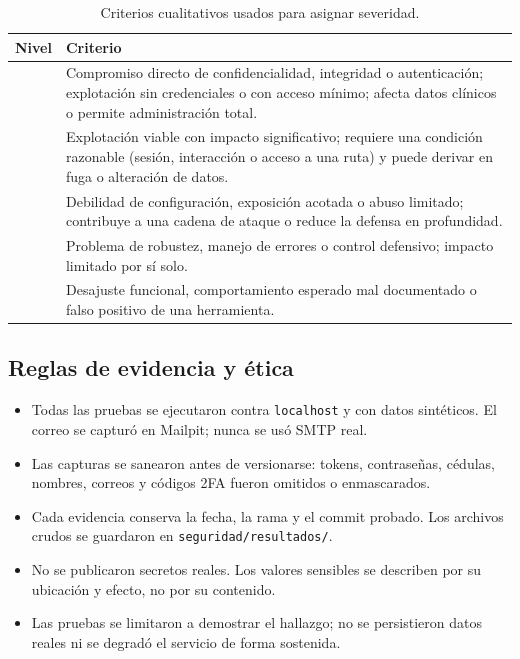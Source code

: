 \begin{table}[htbp]
\centering
\caption{Criterios cualitativos usados para asignar severidad.}
\label{tab:criterios}
\begin{tabular}{@{}L{2.3cm}L{12.6cm}@{}}
\toprule
\textbf{Nivel} & \textbf{Criterio}\\
\midrule
{} & Compromiso directo de confidencialidad, integridad o autenticación; explotación sin credenciales o con acceso mínimo; afecta datos clínicos o permite administración total.\\
 & Explotación viable con impacto significativo; requiere una condición razonable (sesión, interacción o acceso a una ruta) y puede derivar en fuga o alteración de datos.\\
 & Debilidad de configuración, exposición acotada o abuso limitado; contribuye a una cadena de ataque o reduce la defensa en profundidad.\\
 & Problema de robustez, manejo de errores o control defensivo; impacto limitado por sí solo.\\
 & Desajuste funcional, comportamiento esperado mal documentado o falso positivo de una herramienta.\\
\bottomrule
\end{tabular}
\end{table}

\subsection{Reglas de evidencia y ética}

\begin{itemize}
  \item Todas las pruebas se ejecutaron contra \texttt{localhost} y con datos
  sintéticos. El correo se capturó en Mailpit; nunca se usó SMTP real.
  \item Las capturas se sanearon antes de versionarse: tokens, contraseñas,
  cédulas, nombres, correos y códigos 2FA fueron omitidos o enmascarados.
  \item Cada evidencia conserva la fecha, la rama y el commit probado. Los
  archivos crudos se guardaron en \texttt{seguridad/resultados/}.
  \item No se publicaron secretos reales. Los valores sensibles se describen por
  su ubicación y efecto, no por su contenido.
  \item Las pruebas se limitaron a demostrar el hallazgo; no se persistieron
  datos reales ni se degradó el servicio de forma sostenida.
\end{itemize}

